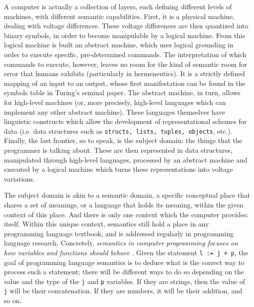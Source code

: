 A computer is actually a collection of layers, each defining different levels of machines, with different semantic capabilities. First, it is a physical machine, dealing with voltage differences. These voltage differences are then quantized into binary symbols, in order to become manipulable by a logical machine. From this logical machine is built an abstract machine, which uses logical grounding in order to execute specific, pre-determined commands. The interpretation of which commands to execute, however, leaves no room for the kind of semantic room for error that humans exhibits (particularly in hermeneutics). It is a strictly defined mapping of an input to an output, whose first manifestation can be found in the symbols table in Turing's seminal paper. The abstract machine, in turn, allows for high-level machines (or, more precisely, high-level languages which can implement any other abstract machine). These languages themselves have linguistic constructs which allow the development of representational schemes for data (i.e. data structures such as \lstinline{structs, lists, tuples, objects}, etc.). Finally, the last frontier, so to speak, is the subject domain: the things that the programmer is talking about. These are then represented in data structures, manipulated through high-level languages, processed by an abstract machine and executed by a logical machine which turns these representations into voltage variations.

The subject domain is akin to a semantic domain, a specific conceptual place that shares a set of meanings, or a language that holds its meaning, within the given context of this place. And there is only one context which the computer provides: itself. Within this unique context, semantics still hold a place in any programming language textbook, and is addressed regularly in programming language research. Concretely, \emph{semantics in computer programming focuses on how variables and functions should behave} \citep{sethi_programming_1996}. Given the statement \lstinline{l := j + p}, the goal of programming language semantics is to deduce what is the correct way to process such a statement; there will be different ways to do so depending on the value and the type of the \lstinline{j} and \lstinline{p} variables. If they are strings, then the value of \lstinline{j} will be their concatenation. If they are numbers, it will be their addition, and so on.

